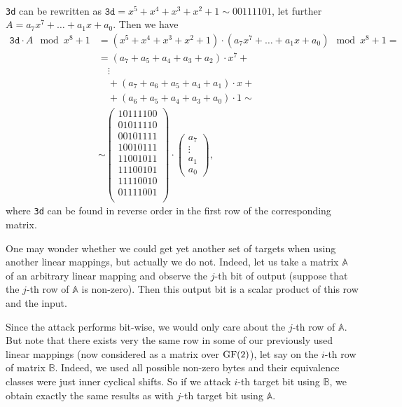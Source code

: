 \newpage   %

\begin{example}
\label{ex:shiftmatrix}
	~ \\
	{\tt 3d} can be rewritten as $\texttt{3d} = x^5+x^4+x^3+x^2+1 \sim 00111101$, let further $A = a_7x^7+\ldots+a_1x+a_0$. Then we have
	\begin{align*}
		\texttt{3d} \cdot A \mod{x^8+1} &= (x^5+x^4+x^3+x^2+1) \cdot (a_7x^7+\ldots+a_1x+a_0) \mod{x^8+1} = \\
		&= (a_7+a_5+a_4+a_3+a_2)\cdot x^7 + ~\\
		&\quad\vdots \\
		&\quad + (a_7+a_6+a_5+a_4+a_1)\cdot x + ~\\
		&\quad + (a_6+a_5+a_4+a_3+a_0)\cdot 1 \sim \\
		&\sim
		\begin{pmatrix}
			\boxed{10111100} \\
			01011110 \\
			00101111 \\
			10010111 \\
			11001011 \\
			11100101 \\
			11110010 \\
			01111001 \\
		\end{pmatrix}
		\cdot
		\begin{pmatrix}
			a_7 \\ \vdots \\ a_1 \\ a_0
		\end{pmatrix} ,
	\end{align*}
	where {\tt 3d} can be found in reverse order in the first row of the corresponding matrix.
\end{example}

One may wonder whether we could get yet another set of targets when using another linear mappings, but actually we do not. Indeed, let us take a matrix $\mathbb{A}$ of an arbitrary linear mapping and observe the $j$-th bit of output (suppose that the $j$-th row of $\mathbb{A}$ is non-zero). Then this output bit is a scalar product of this row and the input.

Since the attack performs bit-wise, we would only care about the $j$-th row of $\mathbb{A}$. But note that there exists very the same row in some of our previously used linear mappings (now considered as a matrix over $\mathrm{GF}(2)$), let say on the $i$-th row of matrix $\mathbb{B}$. Indeed, we used all possible non-zero bytes and their equivalence classes were just inner cyclical shifts. So if we attack $i$-th target bit using $\mathbb{B}$, we obtain exactly the same results as with $j$-th target bit using $\mathbb{A}$.

